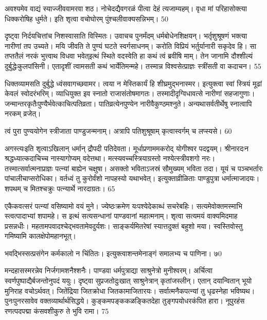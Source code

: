 अवश्यमेव वाद्यं स्याज्जीववामरवा शठ।
नोचेदद्यैवगरळं पीत्वा देहं त्यजाम्यहम्।
वृधा मां परिहासोक्त्या धिक्करोषिह धुर्मते।
इति शृत्वा वचोघोरम् पुंश्चलीवाक्यसन्निभम्।
50

दृष्ट्वा निर्दयचित्तांच निशस्वासाति विस्मितः।
उवाचच पुनर्मंदम् धर्मबोधेनशिक्षयन्।
भर्तृशुश्रूषणं भक्त्या नारीणां तप उच्यते।
मयि जीवति ते पुण्यं घटते स्वर्गसाधनम्।
करोति विप्रियं भर्तुर्यानारी सकृदेव हि।
सा तप्ततैलं नरकं भुत्त्वाथ विधवा भवेत्इत्थं स्थिते वदस्वेति हा कथं त्वं ब्रवीषि माम्।
तेन जानामि दौश्शील्यं दुर्बुद्धेःकुलपांसिनी।
एतादृशीं त्वामसती कथं भार्येतिमन्महे।
तस्मान्न विश्वसेत्प्राज्ञः स्त्रींसती वा कदाचन।
55

धिक्तव्यामसति दुर्बुद्धे ध्वंसवागच्छवामर।
त्वया न मेस्तिकार्यं हि शीघ्रमुद्भनास्मर।
इत्युक्त्वा स्वां स्त्रियं मूढां केवलं स्वोदरंभरिम्।
व्याधियुक्त इव स्नातो राजासंतोषमागतः।
तस्मादीदृग्विधावत्से नारीणां सहजागुणाः।
जन्मान्तरकृतैःपुण्यैर्भवेत्काचित्पतिव्रता।
पातिव्रत्येनपुण्येन नारीवैकुण्ठमश्नुते।
अन्यथासर्वतीर्थेषु स्नात्वापि नरकम् व्रजेत्।

त्वं पुरा पुण्ययोगेन स्त्रीजाता पाण्डुजन्मनाम्।
अत्रापि पतिशुश्रूषाम् कृत्वास्वर्गम् च लप्स्यसे।
60

अगस्त्यःइति शृत्वाऽखिलान् धर्मान् द्रौपदी पतिदेवता।
मूर्धाप्रणाममकरोद् योगीश्वर पदद्वयम्।
श्रीनारदःन श्रद्धध्यात्कदाचिच्च नास्यागोप्यम् वदेत्तथा।
मत्स्यवच्चस्त्रियाग्रस्तो नश्येत्स्त्रीवशगो नरः।
तस्मात्सर्वात्मनाप्राज्ञः पत्न्यां बाह्येन चक्षुषा।
असक्तो भविताऽजस्रं सौमुख्यम् भविता तदा।
यूयं च पञ्चभर्तारः पांचालीचाप्सरोधिका।
वर्तध्वं तु कुरोर्वंशो नापहस्यो यथाभवेत्।
इत्युक्ताव्रीळिताः पाण्डुपुत्रा धर्मात्माजादयः।
शपथम् च मितश्चक्रुः पत्न्यार्थे नारदाग्रतः।
65

एकैकवत्सरं पत्न्यां वसिष्यामो वयं मुने।
ज्येष्ठःक्रमेण यःपश्येदेकाब्धं सचरेबहिः।
सत्यमेवोक्तमस्माभि स्त्वत्पादाभ्यां शपामहे।
स इत्थं सत्यसन्धानां पाण्डवानां महात्मनाम्।
शृत्वा सत्यमयं वाक्यमिदमाह प्रसन्नधीः।
महतामपवादश्चेद्भवतामेवदुर्यशः।
साङ्कर्यमितरेषां स्यात्तदुक्तं बहुशो मया।
स्वस्तिवोस्तु गमिष्यामि कालक्षेपोमहानभूत्।

भवद्भिस्सत्प्रसंगेन कर्मकालो न चिंतितः।
इत्युक्त्वाशन्तमेनाङ्गं समालभ्य च पाणिना।
७0

मन्दहासस्मरन्नेव निर्जगामशनैश्शनैः।
पाण्डवा धर्मपुत्राद्या साश्रुनेत्रो मुनीश्वरम्।
अर्चित्वा स्वर्णपुष्पाद्यैर्बजन्तोनुपदं ययुः।
दृष्ट्वा सुप्रजतोदुःखात् साश्रुनेत्रान् कृतांजस्लीन्।
एतान् दयान्वितान् भूयो मुनिराह वचोऽर्थवत्।
जितेंद्रिया जितक्रोधा जितकामाजितारयः।
सर्वात्मनैकपत्न्यां तु धृढस्नेहा भविष्यथ।
पुनःपुनरसावेव वक्तव्यार्थार्थसिद्धये।
कुङ्कमपङ्ककळङ्कितदेहा तुङ्गपयोधरकंपित हारा।
नूपुरहंस रणत्पदपद्मा कंसवशीकुरु
ते भुवि रामा।
75


